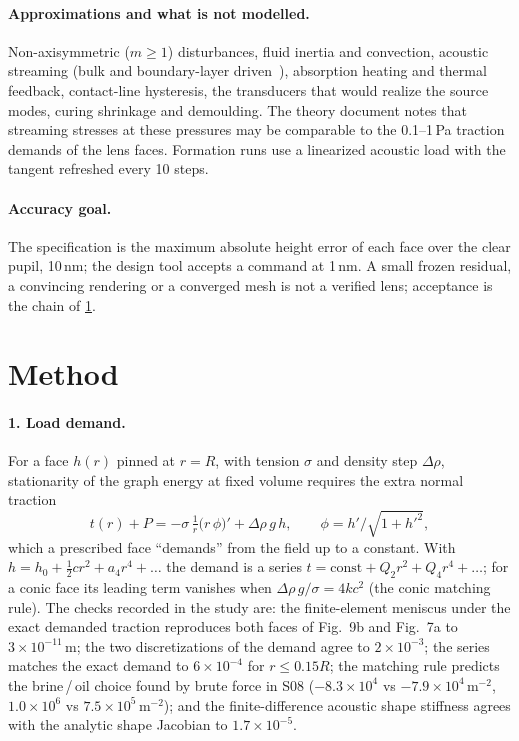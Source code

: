 \documentclass[11pt,a4paper]{article}
\numberwithin{equation}{section}
\begin{document}
\paragraph{Approximations and what is not modelled.} Non-axisymmetric ($m\ge1$)
disturbances, fluid inertia and convection, acoustic streaming (bulk and
boundary-layer driven~\cite{bach2018,jorgensen2021}), absorption heating and
thermal feedback, contact-line hysteresis, the transducers that would realize the
source modes, curing shrinkage and demoulding. The theory document notes that
streaming stresses at these pressures may be comparable to the 0.1--1\,Pa
traction demands of the lens faces. Formation runs use a linearized acoustic
load with the tangent refreshed every 10 steps.

\paragraph{Accuracy goal.} The specification is the maximum absolute height
error of each face over the clear pupil, 10\,nm; the design tool accepts a
command at 1\,nm. A small frozen residual, a convincing rendering or a converged
mesh is not a verified lens; acceptance is the chain of \cref{sec:method}.

\section{Method}\label{sec:method}

\paragraph{1. Load demand.} For a face $h(r)$ pinned at $r=R$, with tension
$\sigma$ and density step $\Delta\rho$, stationarity of the graph energy at fixed
volume requires the extra normal traction
\begin{equation}
 t(r)+P=-\sigma\,\tfrac1r\bigl(r\,\phi\bigr)'+\Delta\rho\,g\,h,\qquad \phi=h'/\sqrt{1+h'^2},
 \label{eq:demand}
\end{equation}
which a prescribed face \enquote{demands} from the field up to a constant. With
$h=h_0+\tfrac12cr^2+a_4r^4+\dots$ the demand is a series
$t=\text{const}+Q_2r^2+Q_4r^4+\dots$; for a conic face its leading term vanishes
when $\Delta\rho\,g/\sigma=4kc^2$ (the conic matching rule). The checks recorded
in the study are: the finite-element meniscus under the exact demanded traction
reproduces both faces of Fig.~9b and Fig.~7a to $3\times10^{-11}$\,m; the two
discretizations of the demand agree to $2\times10^{-3}$; the series matches the
exact demand to $6\times10^{-4}$ for $r\le0.15R$; the matching rule predicts the
brine\,/\,oil choice found by brute force in S08 ($-8.3\times10^4$ vs
$-7.9\times10^4$\,m$^{-2}$, $1.0\times10^6$ vs $7.5\times10^5$\,m$^{-2}$); and
the finite-difference acoustic shape stiffness agrees with the analytic shape
Jacobian to $1.7\times10^{-5}$.
\end{document}
